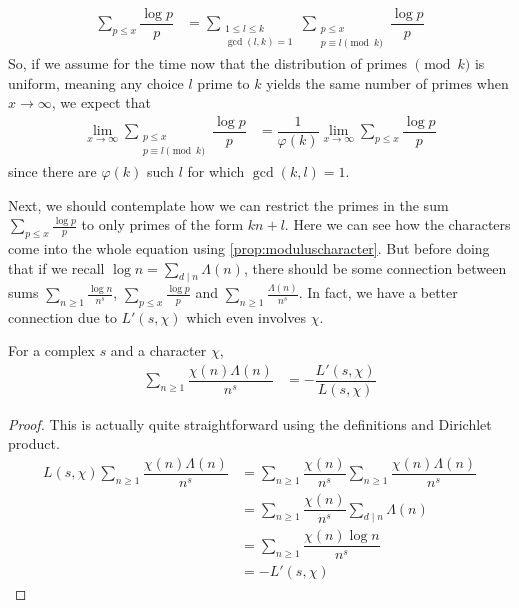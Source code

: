 \documentclass[elemannt.tex]{subfile}
\begin{document}
		\begin{align*}
			\sum_{p\leq x}\dfrac{\log{p}}{p}
				& = \sum_{\substack{1\leq l\leq k\\\gcd(l,k)=1}}\sum_{\substack{p\leq x\\p\equiv l\pmod k}}\dfrac{\log{p}}{p}
		\end{align*}
	So, if we assume for the time now that the distribution of primes $\pmod{k}$ is uniform, meaning any choice $l$ prime to $k$ yields the same number of primes when $x\to\infty$, we expect that
		\begin{align*}
			\lim_{x\to\infty}\sum_{\substack{p\leq x\\p\equiv l\pmod k}}\dfrac{\log{p}}{p}
				& = \dfrac{1}{\varphi(k)}\lim_{x\to\infty}\sum_{p\leq x}\dfrac{\log{p}}{p}
		\end{align*}
	since there are $\varphi(k)$ such $l$ for which $\gcd(k,l)=1$.

	Next, we should contemplate how we can restrict the primes in the sum $\sum_{p\leq x}\frac{\log{p}}{p}$ to only primes of the form $kn+l$. Here we can see how the characters come into the whole equation using \autoref{prop:moduluscharacter}. But before doing that if we recall $\log{n}=\sum_{d\mid n}\Lambda(n)$, there should be some connection between sums $\sum_{n\geq1}\frac{\log{n}}{n^{s}}$, $\sum_{p\leq x}\frac{\log{p}}{p}$ and $\sum_{n\geq1}\frac{\Lambda(n)}{n^{s}}$. In fact, we have a better connection due to $L'(s,\chi)$ which even involves $\chi$.
		\begin{proposition}
			For a complex $s$ and a character $\chi$,
				\begin{align*}
					\sum_{n\geq1}\dfrac{\chi(n)\Lambda(n)}{n^{s}}
						& = -\dfrac{L'(s, \chi)}{L(s, \chi)}
				\end{align*}
		\end{proposition}

		\begin{proof}
			This is actually quite straightforward using the definitions and Dirichlet product.
				\begin{align*}
					L(s,\chi)\sum_{n\geq1}\dfrac{\chi(n)\Lambda(n)}{n^{s}}
						& = \sum_{n\geq1}\dfrac{\chi(n)}{n^{s}}\sum_{n\geq1}\dfrac{\chi(n)\Lambda(n)}{n^{s}}\\
						& = \sum_{n\geq1}\dfrac{\chi(n)}{n^{s}}\sum_{d\mid n}\Lambda(n)\\
						& = \sum_{n\geq1}\dfrac{\chi(n)\log{n}}{n^{s}}\\
						& = -L'(s,\chi)
				\end{align*}
		\end{proof}
\end{document}
